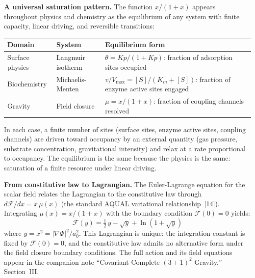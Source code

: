 \documentclass[11pt]{article}
\begin{document}

\textbf{A universal saturation pattern.}\quad
The function $x/(1+x)$ appears throughout physics and chemistry as the equilibrium of any system with finite capacity, linear driving, and reversible transitions:

\begin{center}
\renewcommand{\arraystretch}{1.3}
\begin{tabular}{llp{5.5cm}}
\toprule
\textbf{Domain} & \textbf{System} & \textbf{Equilibrium form} \\
\midrule
Surface physics & Langmuir isotherm & $\theta = Kp/(1+Kp)$: fraction of adsorption sites occupied \\[3pt]
Biochemistry & Michaelis-Menten & $v/V_{\max} = [S]/(K_m + [S])$: fraction of enzyme active sites engaged \\[3pt]
Gravity & Field closure & $\mu = x/(1+x)$: fraction of coupling channels resolved \\
\bottomrule
\end{tabular}
\end{center}
\vspace{0.3em}

\noindent
In each case, a finite number of sites (surface sites, enzyme active sites, coupling channels) are driven toward occupancy by an external quantity (gas pressure, substrate concentration, gravitational intensity) and relax at a rate proportional to occupancy.
The equilibrium is the same because the physics is the same: saturation of a finite resource under linear driving.

\textbf{From constitutive law to Lagrangian.}\quad
The Euler-Lagrange equation for the scalar field relates the Lagrangian to the constitutive law through $d\mathcal{F}/dx = x\,\mu(x)$ (the standard AQUAL variational relationship~[14]).
Integrating $\mu(x) = x/(1+x)$ with the boundary condition $\mathcal{F}(0) = 0$ yields:
\begin{equation*}
\mathcal{F}(y) = \tfrac{1}{2}\,y - \sqrt{y} + \ln\!\left(1 + \sqrt{y}\right)
\end{equation*}
where $y = x^2 = |\nabla\Phi|^2/a_0^2$.
This Lagrangian is unique: the integration constant is fixed by $\mathcal{F}(0) = 0$, and the constitutive law admits no alternative form under the field closure boundary conditions.
The full action and its field equations appear in the companion note ``Covariant-Complete $(3+1)^2$ Gravity,'' Section~III.

\end{document}

